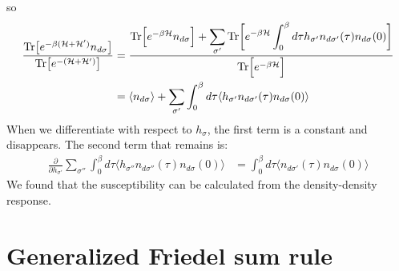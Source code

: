 \documentclass[a4j]{jarticle}
\begin{document}
so
\begin{align}
	\frac{
		{\rm Tr} \big[ e^{- \beta (\mathcal{H}+\mathcal{H}') } n_{d \sigma} \big]
	}{
		{\rm Tr} \big[ e^{- (\mathcal{H}+\mathcal{H}') } \big]
	}
	 & =
	\dfrac{
		{\rm Tr}
		\Big[
			e^{- \beta \mathcal{H} }
			n_{d \sigma}
			\Big]
		+
		\displaystyle \sum_{\sigma'}
		{\rm Tr}
		\bigg[
			e^{- \beta \mathcal{H} }
			\int^{\beta}_{0}d \tau
			h_{\sigma'}
			n_{d \sigma'}(\tau)
			n_{d \sigma}(0)
			\bigg]
	}{
		{\rm Tr}
		\Big[
			e^{- \beta \mathcal{H} }
			\Big]
	}
	\nonumber \\ &=
	\langle n_{d \sigma} \rangle
	+
	\sum_{\sigma'}
	\int^{\beta}_{0}d \tau
	\langle
	h_{\sigma'}
	n_{d \sigma'}(\tau)
	n_{d \sigma}(0)
	\rangle
\end{align}
When we differentiate with respect to $h_{\sigma}$, the first term is a constant and disappears.
The second term that remains is:
\begin{align}
	\frac{\partial}{\partial h_{\sigma'}}
	\sum_{\sigma''}
	\int^{\beta}_{0}d \tau
	\langle
	h_{\sigma''}
	n_{d \sigma''}(\tau)
	n_{d \sigma}(0)
	\rangle
	 & =
	\int^{\beta}_{0}d \tau
	\langle
	n_{d \sigma'}(\tau)
	n_{d \sigma}(0)
	\rangle
\end{align}
We found that the susceptibility can be calculated from the density-density response.

\section*{Generalized Friedel sum rule}
\end{document}
